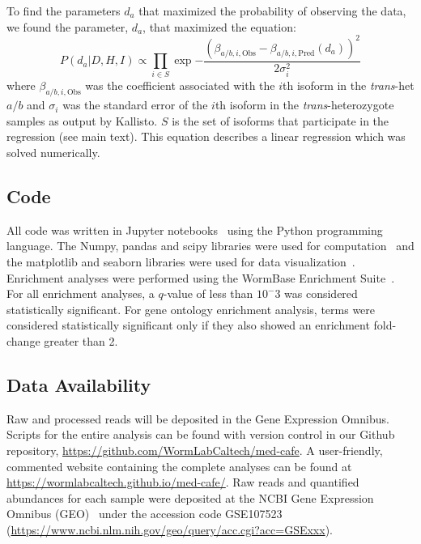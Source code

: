 \documentclass[10pt, twocolumn]{article}
\begin{document}
To find the parameters $d_a$ that maximized the probability of observing the
data, we found the parameter, $d_a$, that maximized the equation:
\begin{equation}
    P(d_a|D,H,I) \propto \prod_{i \in S}
                   \exp{-\frac{{(\beta_{a/b,i,\text{Obs}} -
                                \beta_{a/b,i,\text{Pred}}(d_a))}^2}{
                                2\sigma_i^2}}
\end{equation}
where $\beta_{a/b,i,\text{Obs}}$ was the coefficient associated with the $i$th
isoform in the \emph{trans}-het $a/b$ and $\sigma_i$ was the standard error of
the $i$th isoform in the \emph{trans}-heterozygote samples as output by
Kallisto. $S$ is the set of isoforms that participate in the regression (see
main text). This equation describes a linear regression which was solved
numerically.

\subsection*{Code}
All code was written in Jupyter notebooks~\cite{Perez2007} using the Python
programming language. The Numpy, pandas and scipy libraries were used for
computation~\cite{VanDerWalt2011,McKinney2011,Oliphant2007} and the matplotlib
and seaborn libraries were used for data visualization~\cite{Hunter2007,Waskom}.
Enrichment analyses were performed using the WormBase Enrichment
Suite~\cite{Angeles-Albores2016}. For all enrichment analyses, a $q$-value of
less than $10^-3$ was considered statistically significant. For gene ontology
enrichment analysis, terms were considered statistically significant only if
they also showed an enrichment fold-change greater than 2.

\subsection*{Data Availability}
Raw and processed reads will be deposited in the Gene Expression Omnibus. Scripts
for the entire analysis can be found with version control in our Github
repository, \url{https://github.com/WormLabCaltech/med-cafe}. A user-friendly,
commented website containing the complete analyses can be found at
\url{https://wormlabcaltech.github.io/med-cafe/}. Raw reads and quantified
abundances for each sample were deposited at the NCBI Gene Expression Omnibus
(GEO)~\cite{Edgar2002} under the accession code GSE107523
(\url{https://www.ncbi.nlm.nih.gov/geo/query/acc.cgi?acc=GSExxx}).
\end{document}
